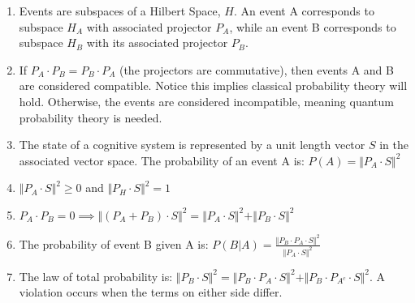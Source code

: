 \documentclass[12pt]{article}
\begin{document}
\begin{tcolorbox}[
	colframe=black!25,
	colback=black!10,
	coltitle=black!20!black,  
	title= \textbf{Box 1}. Key axioms and theorems of quantum probabiliy theory]
	\begin{enumerate}
		\item Events are subspaces of a Hilbert Space, $H$. An event A corresponds to subspace $H_A$ with associated projector $P_A$, while an event B corresponds to subspace $H_B$ with its associated projector $P_B$.
		\item If $P_A \cdot P_B = P_B \cdot P_A$ (the projectors are commutative), then events A and B are considered compatible. Notice this implies classical probability theory will hold. Otherwise, the events are considered incompatible, meaning quantum probability theory is needed. 
		\item The state of a cognitive system is represented by a unit length vector $S$ in the associated vector space. The probability of an event A is: $P(A) = 	\Vert P_A \cdot S \Vert^2$
		\item $\Vert P_A \cdot S \Vert ^2 \geq 0$ and $\Vert P_H \cdot S \Vert ^2 = 1$
		\item $P_A \cdot P_B = 0 \implies \Vert(P_A + P_B) \cdot S \Vert ^2 = \Vert P_A \cdot S \Vert ^2 + \Vert P_B \cdot S \Vert ^2$
		\item The probability of event B given A is: $P(B|A) = \frac{\Vert P_B \cdot P_A \cdot S \Vert ^2}{\Vert P_A \cdot S \Vert ^2}$
		\item The law of total probability is: $\Vert P_B \cdot S \Vert ^2 = \Vert P_B \cdot P_A \cdot S \Vert ^2 + \Vert P_B \cdot P_{A^c} \cdot S \Vert ^2$. A violation occurs when the terms on either side differ. 
	
	\end{enumerate}
	\end{tcolorbox}
\end{document}

